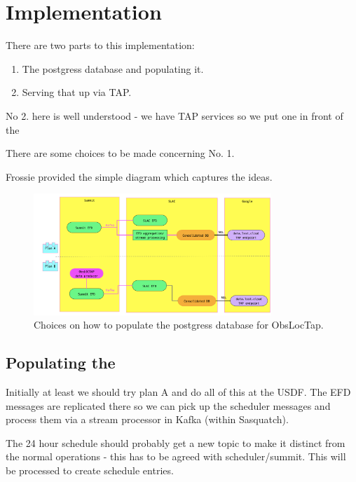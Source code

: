 \section{Implementation}

There are two parts to this implementation:

\begin{enumerate}
\item The postgress database and populating it.
\item Serving that up via TAP.
\end{enumerate}


No 2. here is well understood  - we have TAP services so we put one in front of the \DB

There are some choices to be made concerning No. 1.

Frossie provided the simple diagram  which captures the ideas.


\begin{figure}
\begin{centering}
\includegraphics[width=0.8\textwidth]{obsloctap}
	\caption{ Choices on how to populate the postgress database for ObsLocTap.
\label{fig:obsloctap}}
\end{centering}
\end{figure}


\subsection{Populating the \DB}

Initially at least we should try plan A and do all of this at the USDF.
The EFD messages are replicated there so we can pick up the scheduler messages and process them via a stream processor in Kafka (within Sasquatch).

The 24 hour schedule should probably get a new topic to make it distinct from the normal operations - this has to be agreed with scheduler/summit. This will be processed to create schedule entries.

